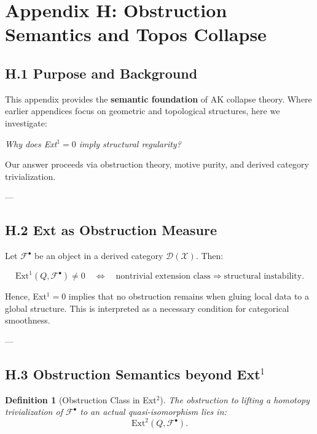 \documentclass[11pt]{article}
\newtheorem{definition}[theorem]{Definition}
\begin{document}
\section*{Appendix H: Obstruction Semantics and Topos Collapse}

\subsection*{H.1 Purpose and Background}

This appendix provides the \textbf{semantic foundation} of AK collapse theory.  
Where earlier appendices focus on geometric and topological structures, here we investigate:

\begin{center}
\textit{Why does Ext$^1 = 0$ imply structural regularity?}  
\end{center}

Our answer proceeds via obstruction theory, motive purity, and derived category trivialization.

---

\subsection*{H.2 Ext as Obstruction Measure}

Let $\mathcal{F}^\bullet$ be an object in a derived category $\mathcal{D}(\mathcal{X})$.  
Then:

\[
\mathrm{Ext}^1(Q, \mathcal{F}^\bullet) \neq 0 \quad \Leftrightarrow \quad 
\text{nontrivial extension class} \Rightarrow \text{structural instability}.
\]

Hence, Ext$^1 = 0$ implies that no obstruction remains when gluing local data to a global structure.  
This is interpreted as a necessary condition for categorical smoothness.

---

\subsection*{H.3 Obstruction Semantics beyond Ext$^1$}

\begin{definition}[Obstruction Class in Ext$^2$]
The obstruction to lifting a homotopy trivialization of $\mathcal{F}^\bullet$ to an actual quasi-isomorphism lies in:
\[
\mathrm{Ext}^2(Q, \mathcal{F}^\bullet).
\]
\end{definition}
\end{document}
